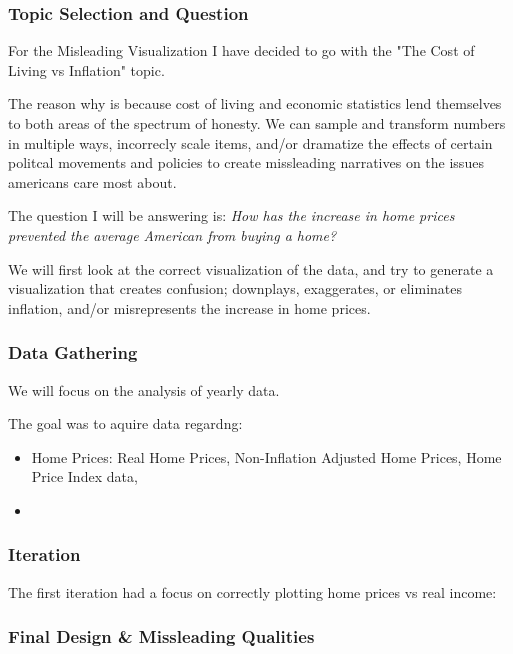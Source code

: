 \documentclass{article}
\begin{document}
\subsubsection{Topic Selection and Question}

For the Misleading Visualization I have decided to go with the "The Cost of Living vs Inflation" topic.

The reason why is because cost of living and economic statistics lend themselves to 
both areas of the spectrum of honesty. We can sample and transform numbers 
in multiple ways, incorrecly scale items, and/or dramatize the effects of 
certain politcal movements and policies to create missleading narratives 
on the issues americans care most about.

The question I will be answering is: 
\textit{How has the increase in home prices prevented the average American from buying a home?}

We will first look at the correct visualization of the data, and try to generate a
visualization that creates confusion; downplays, exaggerates, or eliminates inflation,
and/or misrepresents the increase in home prices.

\subsubsection{Data Gathering}

We will focus on the analysis of yearly data.

The goal was to aquire data regardng:
\begin{itemize}
  \item Home Prices: Real Home Prices, Non-Inflation Adjusted Home Prices, Home Price
  Index data, 
  \item 
\end{itemize}

\subsubsection{Iteration}

The first iteration had a focus on correctly plotting home prices vs real income:

\subsubsection{Final Design \& Missleading Qualities}


\newpage
\begin{refcontext}[sorting=nyt]
\printbibliography
\end{refcontext}
\end{document}
